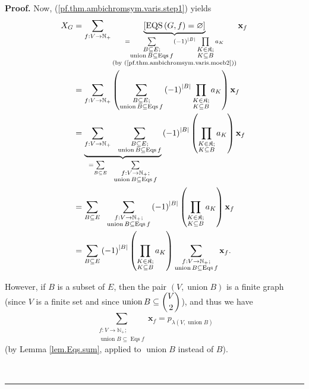\documentclass[numbers=enddot,12pt,final,onecolumn,notitlepage]{scrartcl}%
\theoremstyle{definition}
\newenvironment{proof}[1][Proof]{\noindent\textbf{#1.} }{\ \rule{0.5em}{0.5em}}
\newenvironment{verlong}{}{}
\let\sumnonlimits\sum
\let\prodnonlimits\prod
\renewcommand{\sum}{\sumnonlimits\limits}
\renewcommand{\prod}{\prodnonlimits\limits}
\begin{document}
\begin{verlong}
\begin{proof}
Now, (\ref{pf.thm.ambichromsym.varis.step1}) yields%
\begin{align}
X_{G}  &  =\sum_{f:V\rightarrow\mathbb{N}_{+}}\underbrace{\left[
\operatorname*{EQS}\left(  G,f\right)  =\varnothing\right]  }_{\substack{=\sum
_{\substack{B\subseteq E;\\\operatorname*{union}B\subseteq\operatorname*{Eqs}%
f}}\left(  -1\right)  ^{\left\vert B\right\vert }\prod_{\substack{K\in
\mathfrak{K};\\K\subseteq B}}a_{K}\\\text{(by
(\ref{pf.thm.ambichromsym.varis.moeb2}))}}}\mathbf{x}_{f}\nonumber\\
&  =\sum_{f:V\rightarrow\mathbb{N}_{+}}\left(  \sum_{\substack{B\subseteq
E;\\\operatorname*{union}B\subseteq\operatorname*{Eqs}f}}\left(  -1\right)
^{\left\vert B\right\vert }\prod_{\substack{K\in\mathfrak{K};\\K\subseteq
B}}a_{K}\right)  \mathbf{x}_{f}\nonumber\\
&  =\underbrace{\sum_{f:V\rightarrow\mathbb{N}_{+}}\ \ \sum
_{\substack{B\subseteq E;\\\operatorname*{union}B\subseteq\operatorname*{Eqs}%
f}}}_{=\sum_{B\subseteq E}\ \ \sum_{\substack{f:V\rightarrow\mathbb{N}%
_{+};\\\operatorname*{union}B\subseteq\operatorname*{Eqs}f}}}\left(
-1\right)  ^{\left\vert B\right\vert }\left(  \prod_{\substack{K\in
\mathfrak{K};\\K\subseteq B}}a_{K}\right)  \mathbf{x}_{f}\nonumber\\
&  =\sum_{B\subseteq E}\ \ \sum_{\substack{f:V\rightarrow\mathbb{N}%
_{+};\\\operatorname*{union}B\subseteq\operatorname*{Eqs}f}}\left(  -1\right)
^{\left\vert B\right\vert }\left(  \prod_{\substack{K\in\mathfrak{K}%
;\\K\subseteq B}}a_{K}\right)  \mathbf{x}_{f}\nonumber\\
&  =\sum_{B\subseteq E}\left(  -1\right)  ^{\left\vert B\right\vert }\left(
\prod_{\substack{K\in\mathfrak{K};\\K\subseteq B}}a_{K}\right)  \sum
_{\substack{f:V\rightarrow\mathbb{N}_{+};\\\operatorname*{union}%
B\subseteq\operatorname*{Eqs}f}}\mathbf{x}_{f}.
\label{pf.thm.ambichromsym.varis.step4}%
\end{align}


However, if $B$ is a subset of $E$, then the pair $\left(
V,\operatorname*{union}B\right)  $ is a finite graph (since $V$ is a finite
set and since $\operatorname*{union}B\subseteq\dbinom{V}{2}$), and thus we
have%
\begin{equation}
\sum_{\substack{f:V\rightarrow\mathbb{N}_{+};\\\operatorname*{union}%
B\subseteq\operatorname*{Eqs}f}}\mathbf{x}_{f}=p_{\lambda\left(
V,\operatorname*{union}B\right)  } \label{pf.thm.ambichromsym.varis.p}%
\end{equation}
(by Lemma \ref{lem.Eqs.sum}, applied to $\operatorname*{union}B$ instead of
$B$).


\end{proof}
\end{verlong}
\end{document}
